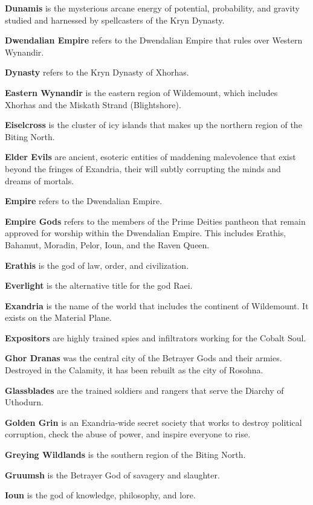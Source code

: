 \documentclass[10pt,a4paper,twoside,bg=print,twocolumn,openany,nodeprecatedcode]{dndbook}
\begin{document}
\textbf{Dunamis} is the mysterious arcane energy of potential, probability, and gravity studied and harnessed by spellcasters of the Kryn Dynasty.

\textbf{Dwendalian Empire} refers to the Dwendalian Empire that rules over Western Wynandir.

\textbf{Dynasty} refers to the Kryn Dynasty of Xhorhas.

\textbf{Eastern Wynandir} is the eastern region of Wildemount, which includes Xhorhas and the Miskath Strand (Blightshore).

\textbf{Eiselcross} is the cluster of icy islands that makes up the northern region of the Biting North.

\textbf{Elder Evils} are ancient, esoteric entities of maddening malevolence that exist beyond the fringes of Exandria, their will subtly corrupting the minds and dreams of mortals.

\textbf{Empire} refers to the Dwendalian Empire.

\textbf{Empire Gods} refers to the members of the Prime Deities pantheon that remain approved for worship within the Dwendalian Empire. This includes Erathis, Bahamut, Moradin, Pelor, Ioun, and the Raven Queen.

\textbf{Erathis} is the god of law, order, and civilization.

\textbf{Everlight} is the alternative title for the god Raei.

\textbf{Exandria} is the name of the world that includes the continent of Wildemount. It exists on the Material Plane.

\textbf{Expositors} are highly trained spies and infiltrators working for the Cobalt Soul.

\textbf{Ghor Dranas} was the central city of the Betrayer Gods and their armies. Destroyed in the Calamity, it has been rebuilt as the city of Rosohna.

\textbf{Glassblades} are the trained soldiers and rangers that serve the Diarchy of Uthodurn.

\textbf{Golden Grin} is an Exandria-wide secret society that works to destroy political corruption, check the abuse of power, and inspire everyone to rise.

\textbf{Greying Wildlands} is the southern region of the Biting North.

\textbf{Gruumsh} is the Betrayer God of savagery and slaughter.

\textbf{Ioun} is the god of knowledge, philosophy, and lore.
\end{document}
